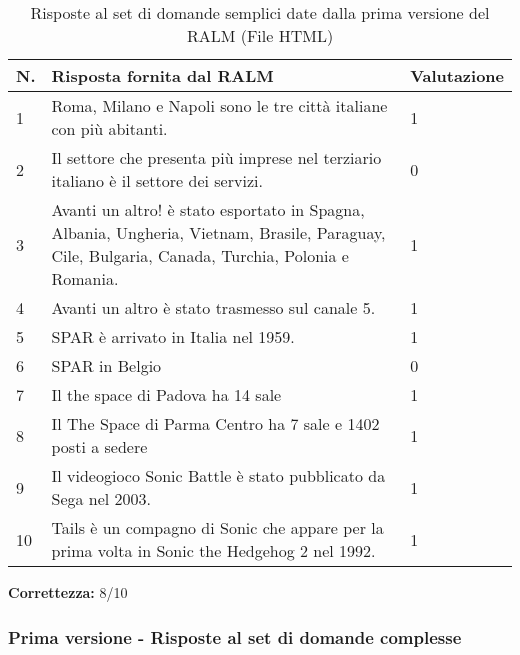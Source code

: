 \begin{table}[H]
    \centering
    \begin{tabular}{|p{0.5cm} |p{6cm} |p{2cm}|}
        \hline
        \textbf{N}. & \textbf{Risposta fornita dal RALM} & \textbf{Valutazione} \\
        \hline
        1 & Roma, Milano e Napoli sono le tre città italiane con più abitanti. & 1 \\
        \hline
        2 & Il settore che presenta più imprese nel terziario italiano è il settore dei servizi. & 0 \\
        \hline
        3 & Avanti un altro! è stato esportato in Spagna, Albania, Ungheria, Vietnam, Brasile, Paraguay, Cile, Bulgaria, Canada, Turchia, Polonia e Romania. & 1 \\
        \hline
        4 & Avanti un altro è stato trasmesso sul canale 5. & 1 \\
        \hline
        5 & SPAR è arrivato in Italia nel 1959. & 1 \\
        \hline
        6 &  SPAR in Belgio & 0 \\
        \hline
        7 & Il the space di Padova ha 14 sale & 1 \\
        \hline
        8 & Il The Space di Parma Centro ha 7 sale e 1402 posti a sedere & 1 \\
        \hline
        9 & Il videogioco Sonic Battle è stato pubblicato da Sega nel 2003. & 1 \\
        \hline
        10 & Tails è un compagno di Sonic che appare per la prima volta in Sonic the Hedgehog 2 nel 1992. & 1 \\
        \hline
    \end{tabular}
    \caption{Risposte al set di domande semplici date dalla prima versione del RALM (File HTML)}
\end{table}

\textbf{Correttezza:} 8/10

\subsubsection{Prima versione - Risposte al set di domande complesse}

